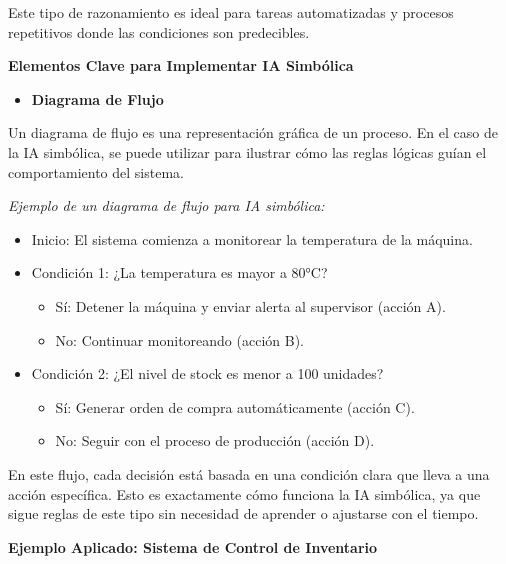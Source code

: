 \documentclass[
  10pt,
  letterpaper,
]{book}
\providecommand{\tightlist}{%
  \setlength{\itemsep}{0pt}\setlength{\parskip}{0pt}}\usepackage{longtable,booktabs,array}
\begin{document}
Este tipo de razonamiento es ideal para tareas automatizadas y procesos
repetitivos donde las condiciones son predecibles.

\textbf{Elementos Clave para Implementar IA Simbólica}

\begin{itemize}
\tightlist
\item
  \textbf{Diagrama de Flujo}
\end{itemize}

Un diagrama de flujo es una representación gráfica de un proceso. En el
caso de la IA simbólica, se puede utilizar para ilustrar cómo las reglas
lógicas guían el comportamiento del sistema.

\emph{Ejemplo de un diagrama de flujo para IA simbólica:}

\begin{itemize}
\tightlist
\item
  Inicio: El sistema comienza a monitorear la temperatura de la máquina.
\item
  Condición 1: ¿La temperatura es mayor a 80°C?

  \begin{itemize}
  \tightlist
  \item
    Sí: Detener la máquina y enviar alerta al supervisor (acción A).
  \item
    No: Continuar monitoreando (acción B).
  \end{itemize}
\item
  Condición 2: ¿El nivel de stock es menor a 100 unidades?

  \begin{itemize}
  \tightlist
  \item
    Sí: Generar orden de compra automáticamente (acción C).
  \item
    No: Seguir con el proceso de producción (acción D).
  \end{itemize}
\end{itemize}

En este flujo, cada decisión está basada en una condición clara que
lleva a una acción específica. Esto es exactamente cómo funciona la IA
simbólica, ya que sigue reglas de este tipo sin necesidad de aprender o
ajustarse con el tiempo.

\textbf{Ejemplo Aplicado: Sistema de Control de Inventario}
\end{document}
